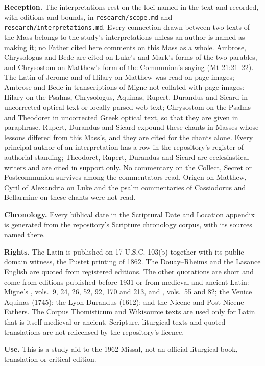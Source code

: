 {\textbf{Reception.} The interpretations rest on the loci named in the text and
recorded, with editions and bounds, in \texttt{research/scope.md} and
\texttt{research/interpretations.md}. Every connection drawn between two texts
of the Mass belongs to the study's interpretations unless an author is named as
making it; no Father cited here comments on this Mass as a whole. Ambrose,
Chrysologus and Bede are cited on Luke's and Mark's forms of the two parables,
and Chrysostom on Matthew's form of the Communion's saying (Mt 21:21--22).
The Latin of Jerome and of Hilary on Matthew was read on page images; Ambrose
and Bede in transcriptions of Migne not collated with page images; Hilary on
the Psalms, Chrysologus, Aquinas, Rupert, Durandus and Sicard in uncorrected
optical text or locally parsed web text; Chrysostom on the Psalms and
Theodoret in uncorrected Greek optical text, so that they are given in
paraphrase. Rupert, Durandus and Sicard expound these chants in Masses whose
lessons differed from this Mass's, and they are cited for the chants alone.
Every principal author of an interpretation has a row in the repository's
register of authorial standing; Theodoret, Rupert, Durandus and Sicard are
ecclesiastical writers and are cited in support only. No commentary on the
Collect, Secret or Postcommunion survives among the commentators read.
Origen on Matthew, Cyril of Alexandria on Luke and the psalm commentaries of
Cassiodorus and Bellarmine on these chants were not read.

\textbf{Chronology.} Every biblical date in the Scriptural Date and Location
appendix is generated from the repository's Scripture chronology corpus,
with its sources named there.

\textbf{Rights.} The Latin is published on 17 U.S.C. 103(b) together with its
public-domain witness, the Pustet printing of 1862. The Douay--Rheims and the
Lasance English are quoted from registered editions. The other quotations are
short and come from editions published before 1931 or from medieval and
ancient Latin: Migne's , vols.~9, 24, 26, 52, 92, 170
and 213, and , vols.~55 and 82; the Venice Aquinas
(1745); the Lyon Durandus (1612); and the Nicene and Post-Nicene Fathers. The
Corpus Thomisticum and Wikisource texts are used only for Latin that is itself
medieval or ancient. Scripture, liturgical texts and quoted translations are
not relicensed by the repository's licence.

\textbf{Use.} This is a study aid to the 1962 Missal, not an official
liturgical book, translation or critical edition.
\par}

